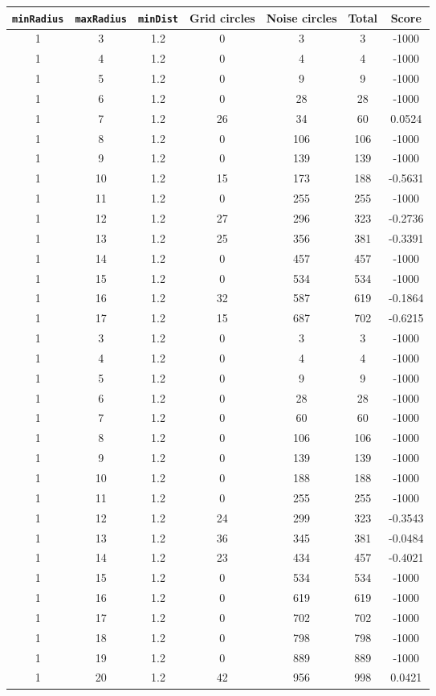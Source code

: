 \documentclass[letterpaper, 12pt]{article}
\begin{document}
\begin{longtable}{|c|c|c|c|c|c|c|}
\hline
\textbf{\texttt{minRadius}} & \textbf{\texttt{maxRadius}} & \textbf{\texttt{minDist}} & \textbf{Grid circles} & \textbf{Noise circles} & \textbf{Total} & \textbf{Score} \\
\hline
1 & 3 & 1.2 & 0 & 3 & 3 & -1000 \\
\hline
1 & 4 & 1.2 & 0 & 4 & 4 & -1000 \\
\hline
1 & 5 & 1.2 & 0 & 9 & 9 & -1000 \\
\hline
1 & 6 & 1.2 & 0 & 28 & 28 & -1000 \\
\hline
1 & 7 & 1.2 & 26 & 34 & 60 & 0.0524 \\
\hline
1 & 8 & 1.2 & 0 & 106 & 106 & -1000 \\
\hline
1 & 9 & 1.2 & 0 & 139 & 139 & -1000 \\
\hline
1 & 10 & 1.2 & 15 & 173 & 188 & -0.5631 \\
\hline
1 & 11 & 1.2 & 0 & 255 & 255 & -1000 \\
\hline
1 & 12 & 1.2 & 27 & 296 & 323 & -0.2736 \\
\hline
1 & 13 & 1.2 & 25 & 356 & 381 & -0.3391 \\
\hline
1 & 14 & 1.2 & 0 & 457 & 457 & -1000 \\
\hline
1 & 15 & 1.2 & 0 & 534 & 534 & -1000 \\
\hline
1 & 16 & 1.2 & 32 & 587 & 619 & -0.1864 \\
\hline
1 & 17 & 1.2 & 15 & 687 & 702 & -0.6215 \\
\hline
1 & 3 & 1.2 & 0 & 3 & 3 & -1000 \\
\hline
1 & 4 & 1.2 & 0 & 4 & 4 & -1000 \\
\hline
1 & 5 & 1.2 & 0 & 9 & 9 & -1000 \\
\hline
1 & 6 & 1.2 & 0 & 28 & 28 & -1000 \\
\hline
1 & 7 & 1.2 & 0 & 60 & 60 & -1000 \\
\hline
1 & 8 & 1.2 & 0 & 106 & 106 & -1000 \\
\hline
1 & 9 & 1.2 & 0 & 139 & 139 & -1000 \\
\hline
1 & 10 & 1.2 & 0 & 188 & 188 & -1000 \\
\hline
1 & 11 & 1.2 & 0 & 255 & 255 & -1000 \\
\hline
1 & 12 & 1.2 & 24 & 299 & 323 & -0.3543 \\
\hline
1 & 13 & 1.2 & 36 & 345 & 381 & -0.0484 \\
\hline
1 & 14 & 1.2 & 23 & 434 & 457 & -0.4021 \\
\hline
1 & 15 & 1.2 & 0 & 534 & 534 & -1000 \\
\hline
1 & 16 & 1.2 & 0 & 619 & 619 & -1000 \\
\hline
1 & 17 & 1.2 & 0 & 702 & 702 & -1000 \\
\hline
1 & 18 & 1.2 & 0 & 798 & 798 & -1000 \\
\hline
1 & 19 & 1.2 & 0 & 889 & 889 & -1000 \\
\hline
1 & 20 & 1.2 & 42 & 956 & 998 & 0.0421 \\
\hline
\end{longtable}
\end{document}
